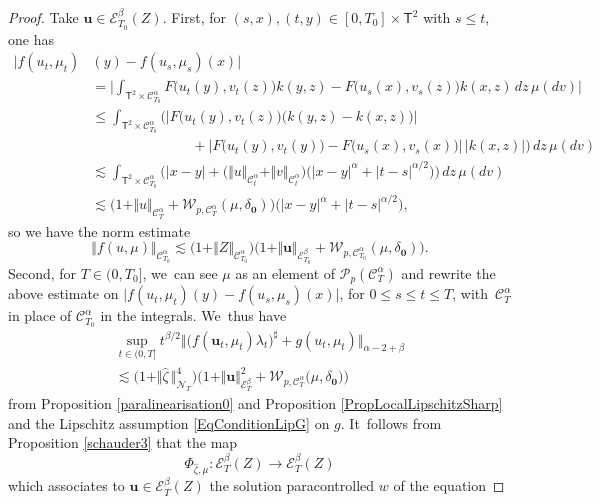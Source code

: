 \documentclass[10pt]{amsart}
\theoremstyle{definition}
\newcommand{\bfzero}{\mathbf{0}}
\newcommand{\mcE}{\mathcal{E}}
\newcommand{\mcN}{\mathcal{N}}
\newcommand{\mcP}{\mathcal{P}}
\newcommand\mcW{\mathcal W}
\newcommand{\bsu}{\boldsymbol{u}}
\newcommand{\scrC}{\ensuremath{\mathscr{C}}}
\newcommand{\norme}[1]{\Vert #1 \Vert}
\begin{document}
\begin{proof}
Take $\bsu\in\mcE^\beta_{T_0}(Z)$. First, for $(s,x),(t,y)\in [0,T_0]\times \mathsf{T}^2$ with $s\leq t$, one has
\begin{align*}
\big|f(u_t,\mu_t)&(y) - f(u_s,\mu_s)(x)\big| \\
&= \big|\int_{\mathsf{T}^2\times\scrC_{T_0}^\alpha} F\bigl(u_t(y),v_t(z)\bigr)k(y,z) - F\bigl(u_s(x),v_s(z)\bigr) k(x,z) \, dz\,\mu(dv)\big| \\
&\leq \int_{\mathsf{T}^2\times\scrC_{T_0}^\alpha} \biggl( \big|F\bigl(u_t(y),v_t(z)\bigr) \bigl(k(y,z)-k(x,z)\bigr)\big|
\\
&\hspace{3cm}+ \big|F\bigl(u_t(y),v_t(y)\bigr)-F\bigl(u_s(x),v_s(x)\bigr)\big| \, |k(x,z)| \biggr) \, dz\,\mu(dv)
\\
&\lesssim \int_{\mathsf{T}^2\times\scrC_{T_0}^\alpha} \bigl( |x-y| +\bigl(\norme{u}_{\scrC^\alpha_t} + \norme{v}_{\scrC^\alpha_t} \bigr) \bigl(|x-y|^\alpha+|t-s|^{\alpha/2}\bigr)\bigr) \, dz\,\mu(dv)
\\
&\lesssim \bigl(1+\norme{u}_{\scrC^\alpha_T}+\mcW_{p,\scrC^\alpha_T}(\mu,\delta_\bfzero) \bigr)\bigl(|x-y|^\alpha+|t-s|^{\alpha/2}\bigr),
\end{align*}
so we have the norm estimate
\[
\norme{f(u,\mu)}_{\scrC^\alpha_{T_0}}\lesssim \bigl(1 + \norme{Z}_{\scrC_{T_0}^\alpha}\bigr) \bigl(1+ \Vert \bsu\Vert_{\mcE^\beta_{T_0}} + \mcW_{p,\scrC^\alpha_{T_0}}(\mu,\delta_\bfzero)\bigr).
\]
Second, for $T\in(0,T_0]$, we~can see $\mu$ as an element of $\mcP_p(\scrC^\alpha_T)$ and rewrite the above estimate on $\big|f(u_t,\mu_t)(y) - f(u_s, \mu_s)(x)\big|$, for $0\leq s\leq t\leq T$, with~$\scrC^\alpha_T$ in place of $\scrC^\alpha_{T_0}$ in the integrals. We~thus have
\begin{multline}\label{estimeerhs1}
\sup_{t\in(0,T]} t^{\beta/2}\big\Vert \bigl(f(\bsu_t,\mu_t)\lambda_t\bigr)^\sharp + g(u_t,\mu_t)\big\Vert_{\alpha-2+\beta}\\ \lesssim \bigl( 1 + \Vert\widehat\zeta\hspace{2pt}\Vert_{{\boldsymbol{\mcN}}_T}^4 \bigr) \bigl(1 + \Vert \bsu\Vert^2_{\mcE^\beta_T} + \mcW_{p,\scrC^\alpha_T}\bigl(\mu,\delta_\bfzero\bigr)\bigr)
\end{multline}
from Proposition \ref{paralinearisation0} and Proposition \ref{PropLocalLipschitzSharp} and the Lipschitz assumption \eqref{EqConditionLipG} on $g$. It~follows from Proposition \ref{schauder3} that the map
\[
\Phi_{\widehat\zeta,\mu} : \mcE^\beta_T(Z) \to\mcE^\beta_T(Z)
\]
which associates to $\bsu\in \mcE^\beta_T(Z)$ the solution paracontrolled $w$ of the equation

\end{proof}
\end{document}

